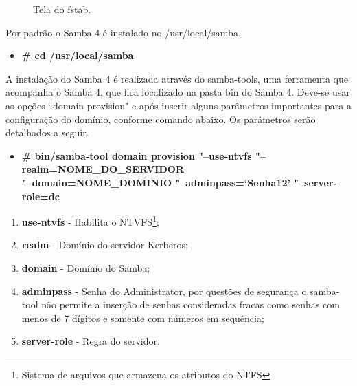 \begin{figure}[ht]
   	\centering
   	\caption{Tela do fstab.}
    \label{fstab}
\end{figure}

\pagebreak

Por padrão o Samba 4 é instalado no /usr/local/samba.

\begin{itemize}
	\item \textbf{\# cd /usr/local/samba}
\end{itemize}

A instalação do Samba 4 é realizada através do samba-tools, uma ferramenta que acompanha o Samba 4, que fica localizado na pasta bin do Samba 4. Deve-se usar as opções ``domain provision" e após inserir alguns parâmetros importantes para a configuração do domínio, conforme comando abaixo. Os parâmetros serão detalhados a seguir.

\begin{itemize}
	\item \textbf{\# bin/samba-tool domain provision "--use-ntvfs "--realm=NOME\_DO\_SERVIDOR  \\"--domain=NOME\_DOMINIO  "--adminpass=`Senha12' "--server-role=dc}
\end{itemize}

\begin{enumerate}
	\item \textbf{use-ntvfs} - Habilita o NTVFS\footnote[3]{Sistema de arquivos que armazena os atributos do NTFS};
	\item \textbf{realm} - Domínio do servidor Kerberos;
	\item \textbf{domain} - Domínio do Samba;
	\item \textbf{adminpass} - Senha do Administrator, por questões de segurança o samba-tool não permite a inserção de senhas consideradas fracas como senhas com menos de 7 dígitos e somente com números em sequência;
	\item \textbf{server-role} - Regra do servidor.
\end{enumerate}

